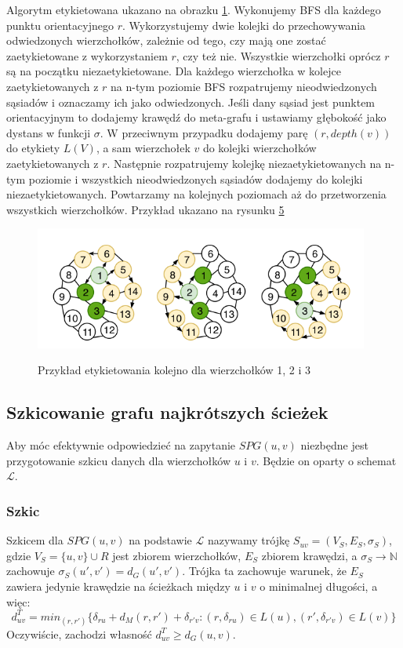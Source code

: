 \documentclass{article}
\theoremstyle{definition}
\begin{document}
            Algorytm etykietowana ukazano na obrazku \hyperref[fig:alg2]{1}. Wykonujemy BFS dla każdego punktu orientacyjnego $r$. Wykorzystujemy dwie kolejki do przechowywania odwiedzonych wierzchołków, zależnie od tego, czy mają one zostać zaetykietowane z wykorzystaniem $r$, czy też nie. Wszystkie wierzchołki oprócz $r$ są na początku niezaetykietowane. Dla każdego wierzchołka w kolejce zaetykietowanych z $r$ na n-tym poziomie BFS rozpatrujemy nieodwiedzonych sąsiadów i oznaczamy ich jako odwiedzonych. Jeśli dany sąsiad jest punktem orientacyjnym to dodajemy krawędź do meta-grafu i ustawiamy głębokość jako dystans w funkcji $\sigma$. W przeciwnym przypadku dodajemy parę $(r, depth(v))$ do etykiety $L(V)$, a sam wierzchołek $v$ do kolejki wierzchołków zaetykietowanych z $r$. Następnie rozpatrujemy kolejkę niezaetykietowanych na n-tym poziomie i wszystkich nieodwiedzonych sąsiadów dodajemy do kolejki niezaetykietowanych. Powtarzamy na kolejnych poziomach aż do przetworzenia wszystkich wierzchołków. Przykład ukazano na rysunku \hyperref[fig:label]{5}

            \begin{figure}[!tbh]
                \includegraphics[width=11cm]{img/labelling.png}
                \centering
                \label{fig:label}
                \caption{Przykład etykietowania kolejno dla wierzchołków 1, 2 i 3}
            \end{figure}

    \subsection{Szkicowanie grafu najkrótszych ścieżek}
        Aby móc efektywnie odpowiedzieć na zapytanie $SPG(u,v)$ niezbędne jest przygotowanie szkicu danych dla wierzchołków $u$ i $v$. Będzie on oparty o schemat $\mathcal{L}$.
        
        \subsubsection*{Szkic}
            Szkicem dla $SPG(u,v)$ na podstawie $\mathcal{L}$ nazywamy trójkę $S_{uv} = (V_S, E_S, \sigma_S)$, gdzie $V_S = \{u,v\} \cup R$ jest zbiorem wierzchołków, $E_S$ zbiorem krawędzi, a $\sigma_S \rightarrow \mathbb{N}$ zachowuje $\sigma_S(u', v') = d_G(u', v')$. Trójka ta zachowuje warunek, że $E_S$ zawiera jedynie krawędzie na ścieżkach między $u$ i $v$ o minimalnej długości, a więc:
            \[
                d_{uv}^T = min_{(r,r')}\{\delta_{ru} + d_M(r,r') + \delta_{r'v} : (r,\delta_{ru}) \in L(u), (r',\delta_{r'v}) \in L(v)\}
            \]
            Oczywiście, zachodzi własność $d_{uv}^T \geq d_G(u,v)$. 
            
\end{document}
